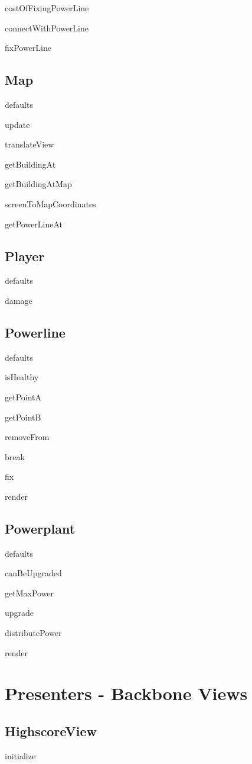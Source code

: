	costOfFixingPowerLine

	connectWithPowerLine

	fixPowerLine

\subsection*{Map}

	defaults

	update

	translateView

	getBuildingAt

	getBuildingAtMap

	screenToMapCoordinates

	getPowerLineAt

\subsection*{Player}

	defaults

	damage

\subsection*{Powerline}

	defaults

	isHealthy

	getPointA

	getPointB

	removeFrom

	break

	fix

	render

\subsection*{Powerplant}

	defaults

	canBeUpgraded

	getMaxPower

	upgrade

	distributePower

	render


\clearpage

\section{Presenters - Backbone Views}
	
\subsection*{HighscoreView}
	initialize
	
